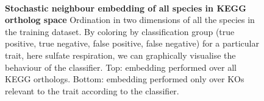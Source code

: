 \documentclass[10pt,letterpaper]{article}
\begin{document}
\begin{figure}
\\
\caption{{\bf Stochastic neighbour embedding of all species in KEGG ortholog space}
Ordination in two dimensions of all the species in the training dataset. By coloring by classification group (true positive, true negative, false positive, false negative) for a particular trait, here sulfate respiration, we can graphically visualise the behaviour of the classifier. Top: embedding performed over all KEGG orthologs. Bottom: embedding performed only over KOs relevant to the trait according to the classifier.}
\label{tsne}
\end{figure}
\end{document}
